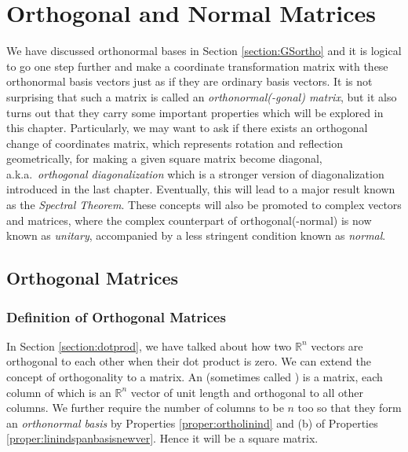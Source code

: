 \chapter{Orthogonal and Normal Matrices}
\label{chap:normalmat}

We have discussed orthonormal bases in Section \ref{section:GSortho} and it is logical to go one step further and make a coordinate transformation matrix with these orthonormal basis vectors just as if they are ordinary basis vectors. It is not surprising that such a matrix is called an \textit{orthonormal(-gonal) matrix}, but it also turns out that they carry some important properties which will be explored in this chapter. Particularly, we may want to ask if there exists an orthogonal change of coordinates matrix, which represents rotation and reflection geometrically, for making a given square matrix become diagonal, a.k.a.\ \textit{orthogonal diagonalization} which is a stronger version of diagonalization introduced in the last chapter. Eventually, this will lead to a major result known as the \textit{Spectral Theorem}. These concepts will also be promoted to complex vectors and matrices, where the complex counterpart of orthogonal(-normal) is now known as \textit{unitary}, accompanied by a less stringent condition known as \textit{normal}. 

\section{Orthogonal Matrices}

\subsection{Definition of Orthogonal Matrices}
In Section \ref{section:dotprod}, we have talked about how two $\mathbb{R}^n$ vectors are orthogonal to each other when their dot product is zero. We can extend the concept of orthogonality to a matrix. An  (sometimes called ) is a matrix, each column of which is an $\mathbb{R}^n$ vector of unit length and orthogonal to all other columns. We further require the number of columns to be $n$ too so that they form an \textit{orthonormal basis} by Properties \ref{proper:ortholinind} and (b) of Properties \ref{proper:linindspanbasisnewver}. Hence it will be a square matrix.

